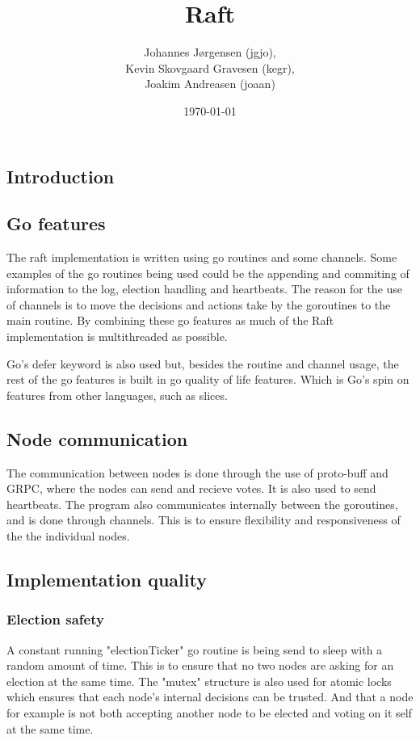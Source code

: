 \documentclass[a4paper,11pt]{article}
\title{Raft}
\author{Johannes Jørgensen (jgjo),\\ Kevin Skovgaard Gravesen (kegr),\\ Joakim Andreasen (joaan)}
\date{\today}
\begin{document}
 

\maketitle

\subsection*{Introduction}

\subsection*{Go features}
The raft implementation is written using go routines and some channels.
Some examples of the go routines being used could be the appending and commiting of information to the log, election handling and heartbeats.
The reason for the use of channels is to move the decisions and actions take by the goroutines to the main routine.
By combining these go features as much of the Raft implementation is multithreaded as possible.

Go's defer keyword is also used but, besides the routine and channel usage, the rest of the go features is built in go quality of life features.
Which is Go's spin on features from other languages, such as slices.

\subsection*{Node communication}
The communication between nodes is done through the use of proto-buff and GRPC, where the nodes can send and recieve votes. It is also used to send heartbeats. 
The program also communicates internally between the goroutines, and is done through channels. This is to ensure flexibility and responsiveness of the the individual nodes. 

\subsection*{Implementation quality}

\subsubsection*{Election safety}
A constant running "electionTicker" go routine is being send to sleep with a random amount of time.
This is to ensure that no two nodes are asking for an election at the same time.
The "mutex" structure is also used for atomic locks which ensures that each node's internal decisions can be trusted.
And that a node for example is not both accepting another node to be elected and voting on it self at the same time.
\end{document}
